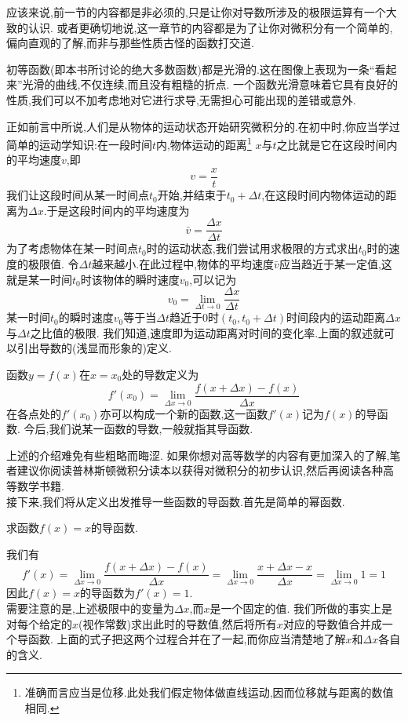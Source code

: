 \documentclass{ctexart}
\begin{document}
\indent 应该来说,前一节的内容都是非必须的,只是让你对导数所涉及的极限运算有一个大致的认识.%
或者更确切地说,这一章节的内容都是为了让你对微积分有一个简单的,偏向直观的了解,而非与那些性质古怪的函数打交道.
\begin{hint}
    初等函数(即本书所讨论的绝大多数函数)都是光滑的.这在图像上表现为一条“看起来”光滑的曲线,不仅连续,而且没有粗糙的折点.%
    一个函数光滑意味着它具有良好的性质,我们可以不加考虑地对它进行求导,无需担心可能出现的差错或意外.
\end{hint}
正如前言中所说,人们是从物体的运动状态开始研究微积分的.在初中时,你应当学过简单的运动学知识:在一段时间$t$内,物体运动的距离\footnote{准确而言应当是位移.此处我们假定物体做直线运动,因而位移就与距离的数值相同.}%
$x$与$t$之比就是它在这段时间内的平均速度$v$,即
\[v=\dfrac xt\]
我们让这段时间从某一时间点$t_0$开始,并结束于$t_0+\Delta t$,在这段时间内物体运动的距离为$\Delta x$.于是这段时间内的平均速度为
\[\bar{v}=\dfrac{\Delta x}{\Delta t}\]
为了考虑物体在某一时间点$t_0$时的运动状态,我们尝试用求极限的方式求出$t_0$时的速度的极限值.%
令$\Delta t$越来越小.在此过程中,物体的平均速度$\bar{v}$应当趋近于某一定值,这就是某一时间$t_0$时该物体的瞬时速度$v_0$,可以记为
\[v_0=\lim_{\Delta t\to 0}\dfrac{\Delta x}{\Delta t}\]
某一时间$t_0$的瞬时速度$v_0$等于当$\Delta t$趋近于$0$时$\left(t_0,t_0+\Delta t\right)$时间段内的运动距离$\Delta x$与$\Delta t$之比值的极限.%
我们知道,速度即为运动距离对时间的变化率.上面的叙述就可以引出导数的(浅显而形象的)定义.
\begin{definition}[0A.1.1 导数]
    函数$y=f(x)$在$x=x_0$处的导数定义为
    \[f'\left(x_0\right)=\lim_{\Delta x\to 0}\dfrac{f\left(x+\Delta x\right)-f(x)}{\Delta x}\]
    在各点处的$f'\left(x_0\right)$亦可以构成一个新的函数,这一函数$f'(x)$记为$f(x)$的导函数.%
    今后,我们说某一函数的导数,一般就指其导函数.
\end{definition}
上述的介绍难免有些粗略而晦涩.%
如果你想对高等数学的内容有更加深入的了解,笔者建议你阅读普林斯顿微积分读本以获得对微积分的初步认识,然后再阅读各种高等数学书籍.\vspace{4pt}\\
\indent 接下来,我们将从定义出发推导一些函数的导函数.首先是简单的幂函数.
\begin{problem}[P.0A.2]
    求函数$f(x)=x$的导函数.
\end{problem}
\begin{derivation}
    我们有
    \[f'(x)=\lim_{\Delta x\to0}\dfrac{f(x+\Delta x)-f(x)}{\Delta x}
    =\lim_{\Delta x\to0}\dfrac{x+\Delta x-x}{\Delta x}=\lim_{\Delta x\to0}1=1\]
    因此$f(x)=x$的导函数为$f'(x)=1$.\\
    需要注意的是,上述极限中的变量为$\Delta x$,而$x$是一个固定的值.%
    我们所做的事实上是对每个给定的$x$(视作常数)求出此时的导数值,然后将所有$x$对应的导数值合并成一个导函数.%
    上面的式子把这两个过程合并在了一起,而你应当清楚地了解$x$和$\Delta x$各自的含义.
\end{derivation}
\end{document}
